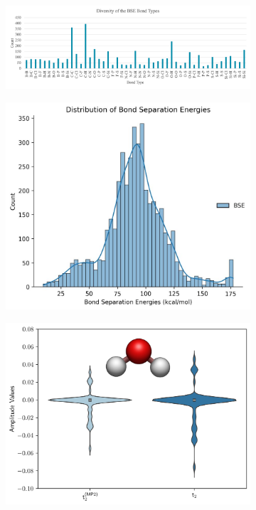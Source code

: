 \documentclass[journal=jacsat,manuscript=article]{achemso}
\begin{document}
\begin{figure}[H]
	\centering
	\begin{subfigure}[b]{0.65\textwidth}
		\centering
		\includegraphics[width=\textwidth]{../images/BSE/bondtypes.png}
		\caption{}
		\label{fig:bondtypes}
	\end{subfigure}
	\hfill
	\begin{subfigure}[b]{0.3\textwidth}
		\centering
		\includegraphics[width=\textwidth]{../images/BSE/BSE.jpg}
		\caption{}
		\label{fig:BSEdistr}
	\end{subfigure}
	\hfill
	\begin{subfigure}[b]{0.3\textwidth}
		\centering
		\includegraphics[width=\textwidth]{../images/manuscript_figures/waterddccdistribution.png}

\end{subfigure}
\end{figure}
\end{document}
